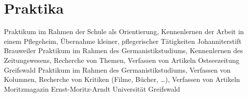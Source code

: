 \documentclass[11pt,a4paper]{moderncv}
\begin{document}
    \section{Praktika}
        {Praktikum im Rahmen der Schule als Orientierung, \newline%
        Kennenlernen der Arbeit in einem Pflegeheim, \newline%
        Übernahme kleiner, pflegerischer Tätigkeiten\newline}{}%
        {Johanniterstift Brauweiler}{}
        {Praktikum im Rahmen des Germanistikstudiums, \newline%
        Kennenlernen des Zeitungswesens, %
        Recherche von Themen, \newline%
        Verfassen von Artikeln\newline}{}%
        {Ostseezeitung Greifswald}{}
        {Praktikum im Rahmen des Germanistikstudiums, %
        Verfassen von Kolumnen, \newline%
        Recherche von Kritiken (Filme, Bücher, \dots), %
        Verfassen von Artikeln\newline}{}%
        {Moritzmagazin Ernst-Moritz-Arndt Universität Greifswald}{}%
\end{document}
